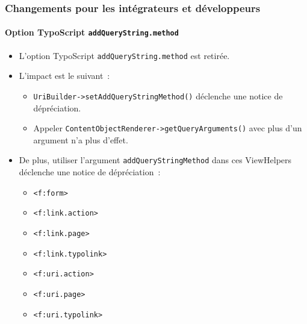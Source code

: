 %

\begin{frame}[fragile]
	\frametitle{Changements pour les intégrateurs et développeurs}
	\framesubtitle{Option TypoScript \texttt{addQueryString.method}}

	\begin{itemize}
		\item L'option TypoScript \texttt{addQueryString.method} est retirée.
		\item L'impact est le suivant~:

			\begin{itemize}\smaller
				\item \texttt{UriBuilder->setAddQueryStringMethod()} déclenche une notice de dépréciation.
				\item Appeler \texttt{ContentObjectRenderer->getQueryArguments()} avec plus d'un argument n'a plus d'effet.
			\end{itemize}\normalsize

		\item De plus, utiliser l'argument \texttt{addQueryStringMethod} dans
			ces ViewHelpers déclenche une notice de dépréciation~:

			\begin{itemize}\smaller
				\item \texttt{<f:form>}
				\item \texttt{<f:link.action>}
				\item \texttt{<f:link.page>}
				\item \texttt{<f:link.typolink>}
				\item \texttt{<f:uri.action>}
				\item \texttt{<f:uri.page>}
				\item \texttt{<f:uri.typolink>}
			\end{itemize}\normalsize

	\end{itemize}

\end{frame}

